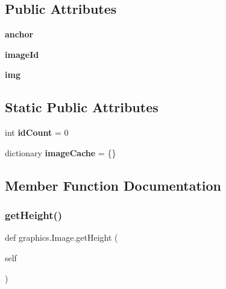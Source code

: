 \subsection*{Public Attributes}
\begin{DoxyCompactItemize}
\item 
\mbox{\label{classgraphics_1_1_image_acc3e91e765b3f90bcfa825cf39b931cd}} 
{\bfseries anchor}
\item 
\mbox{\label{classgraphics_1_1_image_a828ed2128760fd4b813ea80c49bdadb7}} 
{\bfseries image\+Id}
\item 
\mbox{\label{classgraphics_1_1_image_a9accbb024d2332c73737270a6c50e402}} 
{\bfseries img}
\end{DoxyCompactItemize}
\subsection*{Static Public Attributes}
\begin{DoxyCompactItemize}
\item 
\mbox{\label{classgraphics_1_1_image_a258028ba5c61bd2f207b60479b8e88a6}} 
int {\bfseries id\+Count} = 0
\item 
\mbox{\label{classgraphics_1_1_image_a7a552e05624726d285476348222c32d4}} 
dictionary {\bfseries image\+Cache} = \{\}
\end{DoxyCompactItemize}


\subsection{Member Function Documentation}
\mbox{\label{classgraphics_1_1_image_ab092ccc35755f176309971023f912d67}} 
\subsubsection{\texorpdfstring{get\+Height()}{getHeight()}}
{\footnotesize\ttfamily def graphics.\+Image.\+get\+Height (\begin{DoxyParamCaption}\item[{}]{self }\end{DoxyParamCaption})}

